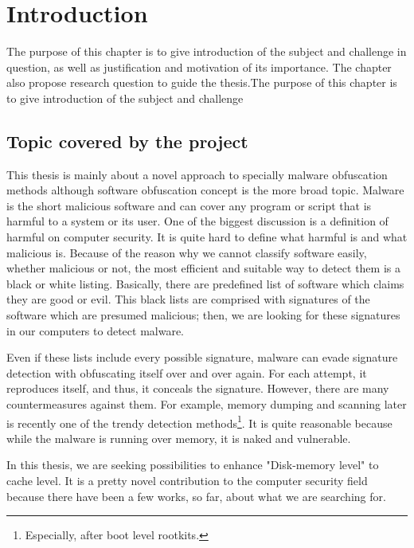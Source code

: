 \chapter{Introduction}
The purpose of this chapter is to give introduction of the subject and challenge in question, as well as justification and motivation of its importance. The chapter also propose research question to guide the thesis.The purpose of this chapter is to give introduction of the subject and challenge

\section{Topic covered by the project}
This thesis is mainly about a novel approach to specially malware obfuscation methods although software obfuscation concept is the more broad topic. Malware is the short malicious software and can cover any program or script that is harmful to a system or its user. One of the biggest discussion is a definition of harmful on computer security. It is quite hard to define what harmful is and what malicious is. Because of the reason why we cannot classify software easily, whether malicious or not, the most efficient and suitable way to detect them is a black or white listing. Basically, there are predefined list of software which claims they are good or evil. This black lists are comprised with signatures of the software which are presumed malicious; then, we are looking for these signatures in our computers to detect malware. 

Even if these lists include every possible signature, malware can evade signature detection with obfuscating itself over and over again. For each attempt, it reproduces itself, and thus, it conceals the signature. However, there are many countermeasures against them\cite{moser2007limits}\cite{egele2012survey}. For example, memory dumping and scanning later is recently one of the trendy detection methods\footnote{Especially, after boot level rootkits.}. It is quite reasonable because while the malware is running over memory, it is naked and vulnerable.

In this thesis, we are seeking possibilities to enhance "Disk-memory level" to cache level. It is a pretty novel contribution to the computer security field because there have been a few works, so far, about what we are searching for.


